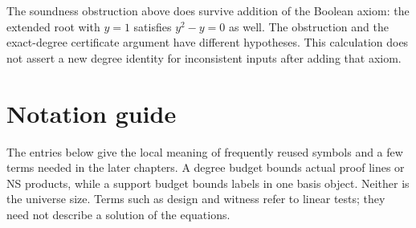 The soundness obstruction above does survive addition of the Boolean
axiom: the extended root with \(y=1\) satisfies \(y^2-y=0\) as well.
The obstruction and the exact-degree certificate argument have
different hypotheses. This calculation does not assert a new
degree identity for inconsistent inputs after adding that axiom.


\par


\section{Notation guide}
The entries below give the local meaning of frequently reused symbols
and a few terms needed in the later chapters. A degree budget bounds
actual proof lines or NS products, while a support budget bounds labels
in one basis object. Neither is the universe size. Terms such as design
and witness refer to linear tests; they need not describe a solution of
the equations.


